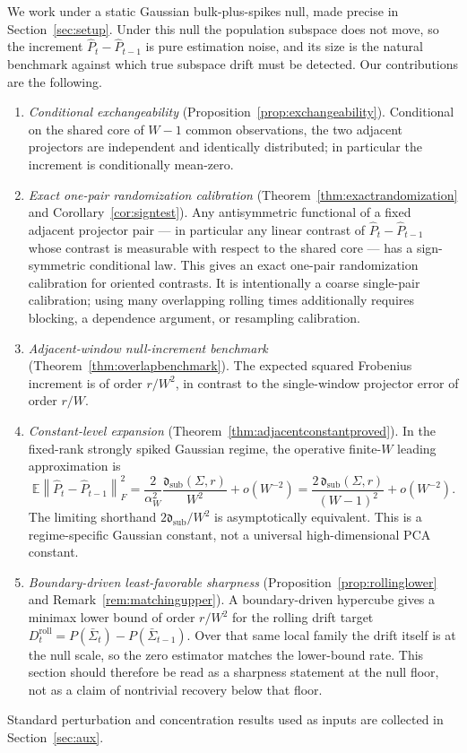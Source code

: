 \documentclass[11pt]{article}
\theoremstyle{tightplain}
\theoremstyle{tightdef}
\newcommand{\E}{\mathbb E}
\newcommand{\norm}[1]{\left\lVert #1 \right\rVert}
\newcommand{\dsub}{\mathfrak d_{\mathrm{sub}}}
\begin{document}
We work under a static Gaussian bulk-plus-spikes null, made precise in
Section~\ref{sec:setup}. Under this null the population subspace does not move,
so the increment $\widehat P_t-\widehat P_{t-1}$ is pure estimation noise, and
its size is the natural benchmark against which true subspace drift must be
detected. Our contributions are the following.
\begin{enumerate}
\item \emph{Conditional exchangeability}
(Proposition~\ref{prop:exchangeability}). Conditional on the shared core of
$W-1$ common observations, the two adjacent projectors are independent and
identically distributed; in particular the increment is conditionally
mean-zero.
\item \emph{Exact one-pair randomization calibration}
(Theorem~\ref{thm:exactrandomization} and Corollary~\ref{cor:signtest}). Any
antisymmetric functional of a fixed adjacent projector pair --- in particular
any linear contrast of $\widehat P_t-\widehat P_{t-1}$ whose contrast is
measurable with respect to the shared core --- has a sign-symmetric conditional
law. This gives an exact one-pair randomization calibration for oriented
contrasts. It is intentionally a coarse single-pair calibration; using many
overlapping rolling times additionally requires blocking, a dependence argument,
or resampling calibration.
\item \emph{Adjacent-window null-increment benchmark}
(Theorem~\ref{thm:overlapbenchmark}). The expected squared Frobenius increment
is of order $r/W^2$, in contrast to the single-window projector error of order
$r/W$.
\item \emph{Constant-level expansion}
(Theorem~\ref{thm:adjacentconstantproved}). In the fixed-rank strongly spiked
Gaussian regime, the operative finite-$W$ leading approximation is
\[
\E\norm{\widehat P_t-\widehat P_{t-1}}_F^2
= \frac{2}{\alpha_W^2}\frac{\dsub(\Sigma,r)}{W^2}
+o(W^{-2})
=\frac{2\,\dsub(\Sigma,r)}{(W-1)^2}+o(W^{-2}).
\]
The limiting shorthand $2\mathfrak d_{\mathrm{sub}}/W^2$ is asymptotically
equivalent. This is a regime-specific Gaussian constant, not a universal
high-dimensional PCA constant.
\item \emph{Boundary-driven least-favorable sharpness}
(Proposition~\ref{prop:rollinglower} and Remark~\ref{rem:matchingupper}). A
boundary-driven hypercube gives a minimax lower bound of order $r/W^2$ for the
rolling drift target
$D_t^{\mathrm{roll}}=P(\bar\Sigma_t)-P(\bar\Sigma_{t-1})$. Over that same
local family the drift itself is at the null scale, so the zero estimator
matches the lower-bound rate. This section should therefore be read as a
sharpness statement at the null floor, not as a claim of nontrivial recovery
below that floor.
\end{enumerate}
Standard perturbation and concentration results used as inputs are collected in
Section~\ref{sec:aux}.
\end{document}

